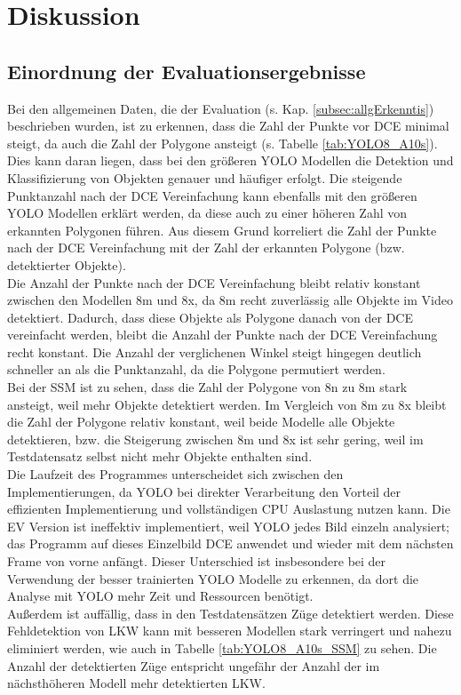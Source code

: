\chapter{Diskussion}
\label{ch:Diskussion}
{ 

	\section{Einordnung der Evaluationsergebnisse}
	{
		Bei den allgemeinen Daten, die der Evaluation (s. Kap. \ref{subsec:allgErkenntis}) beschrieben wurden, ist zu erkennen, dass die Zahl der Punkte vor DCE minimal steigt, da auch die Zahl der Polygone ansteigt (s. Tabelle \ref{tab:YOLO8_A10s}). Dies kann daran liegen, dass bei den größeren YOLO Modellen die Detektion und Klassifizierung von Objekten genauer und häufiger erfolgt. Die steigende Punktanzahl nach der DCE Vereinfachung kann ebenfalls mit den größeren YOLO Modellen erklärt werden, da diese auch zu einer höheren Zahl von erkannten Polygonen führen. Aus diesem Grund korreliert die Zahl der Punkte nach der DCE Vereinfachung mit der Zahl der erkannten Polygone (bzw. detektierter Objekte).\\
		Die Anzahl der Punkte nach der DCE Vereinfachung bleibt relativ konstant zwischen den Modellen 8m und 8x, da 8m recht zuverlässig alle Objekte im Video detektiert. Dadurch, dass diese Objekte als Polygone danach von der DCE vereinfacht werden, bleibt die Anzahl der Punkte nach der DCE Vereinfachung recht konstant. Die Anzahl der verglichenen Winkel steigt hingegen deutlich schneller an als die Punktanzahl, da die Polygone permutiert werden. \\
		Bei der SSM ist zu sehen, dass die Zahl der Polygone von 8n zu 8m stark ansteigt, weil mehr Objekte detektiert werden. Im Vergleich von 8m zu 8x bleibt die Zahl der Polygone relativ  konstant, weil beide Modelle alle Objekte detektieren, bzw. die Steigerung zwischen 8m und 8x ist sehr gering, weil im Testdatensatz selbst nicht mehr Objekte enthalten sind. \\
		Die Laufzeit des Programmes unterscheidet sich zwischen den Implementierungen, da YOLO bei direkter Verarbeitung den Vorteil der effizienten Implementierung und vollständigen CPU Auslastung nutzen kann. Die EV Version ist ineffektiv implementiert, weil YOLO jedes Bild einzeln analysiert; das Programm auf dieses Einzelbild DCE anwendet und wieder mit dem nächsten Frame von vorne anfängt. Dieser Unterschied ist insbesondere bei der Verwendung der besser trainierten YOLO Modelle zu erkennen, da dort die Analyse mit YOLO mehr Zeit und Ressourcen benötigt. \\
		Außerdem ist auffällig, dass in den Testdatensätzen Züge detektiert werden. Diese Fehldetektion von LKW kann mit besseren Modellen stark verringert und nahezu eliminiert werden, wie auch in Tabelle \ref{tab:YOLO8_A10s_SSM} zu sehen. Die Anzahl der detektierten Züge entspricht ungefähr der Anzahl der im nächsthöheren Modell mehr detektierten LKW. \\

}}
